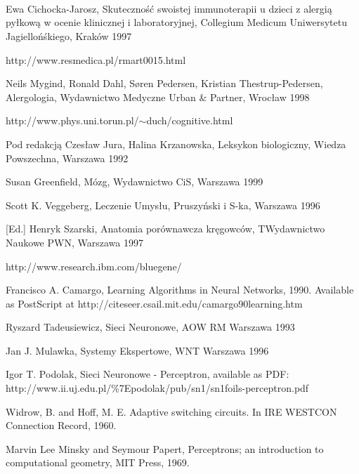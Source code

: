\documentclass[10pt,oneside]{memoir}
\begin{document}
~\nocite{Statistica:2004}


~\nocite{StatSoft:2001}


~\nocite{Yao:1993}


\begin{thebibliography}{0}


Ewa Cichocka-Jarosz, Skuteczność swoistej immunoterapii u dzieci z alergią pyłkową w ocenie klinicznej i laboratoryjnej, Collegium Medicum Uniwersytetu Jagiellońśkiego, Kraków 1997

http://www.resmedica.pl/rmart0015.html

Neils Mygind, Ronald Dahl, Søren Pedersen, Kristian Thestrup-Pedersen, Alergologia, Wydawnictwo Medyczne Urban \& Partner, Wrocław 1998

http://www.phys.uni.torun.pl/\ensuremath{\sim}duch/cognitive.html

Pod redakcją Czesław Jura, Halina Krzanowska, Leksykon biologiczny, Wiedza Powszechna, Warszawa 1992

Susan Greenfield, Mózg, Wydawnictwo CiS, Warszawa 1999

Scott K. Veggeberg, Leczenie Umysłu, Pruszyński i S-ka, Warszawa 1996

[Ed.] Henryk Szarski, Anatomia porównawcza kręgowców, TWydawnictwo Naukowe PWN, Warszawa 1997

http://www.research.ibm.com/bluegene/

Francisco A. Camargo, Learning Algorithms in Neural Networks, 1990. Available as PostScript at http://citeseer.csail.mit.edu/camargo90learning.htm

Ryszard Tadeusiewicz, Sieci Neuronowe, AOW RM Warszawa 1993

Jan J. Mulawka, Systemy Ekspertowe, WNT Warszawa 1996

Igor T. Podolak, Sieci Neuronowe - Perceptron, available as PDF: http://www.ii.uj.edu.pl/\%7Epodolak/pub/sn1/sn1foils-perceptron.pdf

Widrow, B. and Hoff, M. E. Adaptive switching circuits. In IRE WESTCON Connection Record, 1960.

Marvin Lee Minsky and Seymour Papert, Perceptrons; an introduction to computational geometry, MIT Press, 1969.


\end{thebibliography}
\end{document}
